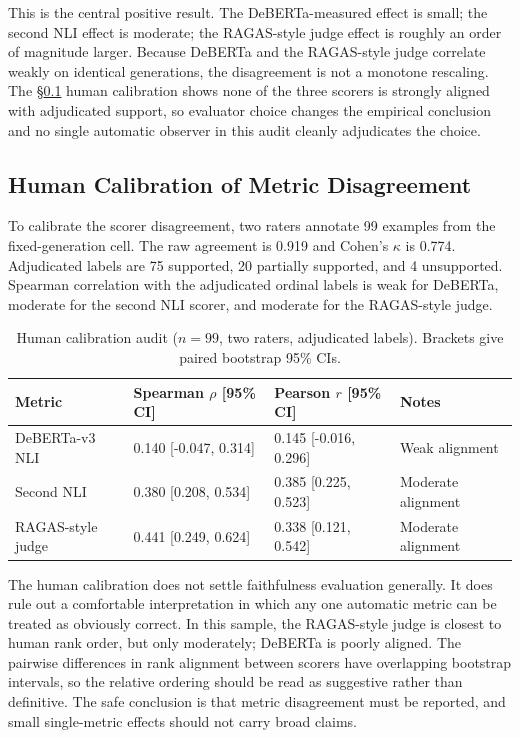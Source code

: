 This is the central positive result. The DeBERTa-measured effect is small;
the second NLI effect is moderate; the RAGAS-style judge effect is roughly an
order of magnitude larger. Because DeBERTa and the RAGAS-style judge correlate
weakly on identical generations, the disagreement is not a monotone rescaling.
The \S\ref{sec:human_calibration} human calibration shows none of the three
scorers is strongly aligned with adjudicated support, so evaluator choice
changes the empirical conclusion and no single automatic observer in this
audit cleanly adjudicates the choice.

\subsection{Human Calibration of Metric Disagreement}
\label{sec:human_calibration}

To calibrate the scorer disagreement, two raters annotate 99 examples from the
fixed-generation cell. The raw agreement is 0.919 and Cohen's \(\kappa\) is
0.774. Adjudicated labels are 75 supported, 20 partially supported, and 4
unsupported. Spearman correlation with the adjudicated ordinal labels is weak
for DeBERTa, moderate for the second NLI scorer, and moderate for the
RAGAS-style judge.

\begin{table}[H]
\centering
\scriptsize
\caption{Human calibration audit (\(n=99\), two raters, adjudicated labels).
Brackets give paired bootstrap 95\% CIs.}
\label{tab:human_calibration}
\begin{tabular}{llll}
\toprule
Metric & Spearman \(\rho\) [95\% CI] & Pearson \(r\) [95\% CI] & Notes \\
\midrule
DeBERTa-v3 NLI & 0.140 [-0.047, 0.314] & 0.145 [-0.016, 0.296] & Weak alignment \\
Second NLI & 0.380 [0.208, 0.534] & 0.385 [0.225, 0.523] & Moderate alignment \\
RAGAS-style judge & 0.441 [0.249, 0.624] & 0.338 [0.121, 0.542] & Moderate alignment \\
\bottomrule
\end{tabular}
\end{table}

The human calibration does not settle faithfulness evaluation generally. It
does rule out a comfortable interpretation in which any one automatic metric
can be treated as obviously correct. In this sample, the RAGAS-style judge is
closest to human rank order, but only moderately; DeBERTa is poorly aligned.
The pairwise differences in rank alignment between scorers have overlapping
bootstrap intervals, so the relative ordering should be read as suggestive
rather than definitive. The safe conclusion is that metric disagreement must
be reported, and small single-metric effects should not carry broad claims.
